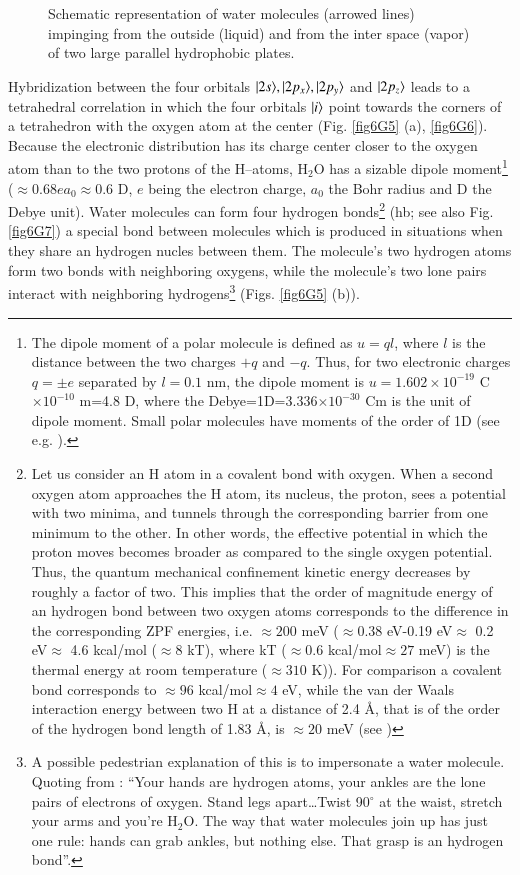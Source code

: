 \begin{subappendices}
\begin{figure}
\caption{Schematic representation of water molecules (arrowed lines) impinging from the outside (liquid) and from the inter space (vapor) of two large parallel hydrophobic plates.}\label{fig6G8}
\end{figure}
Hybridization between the four orbitals $|{2s} \rangle,|{2p_x} \rangle,|{2p_y} \rangle$ and $|{2p_z} \rangle$ leads to a tetrahedral correlation in which the four orbitals $|{i} \rangle$ point towards the corners of a tetrahedron with the oxygen atom at the center (Fig. \ref{fig6G5} (a), \ref{fig6G6}). Because the electronic distribution has its charge center closer to the oxygen atom than to the two protons of the H--atoms, H$_2$O has a sizable dipole moment\footnote{The dipole moment of a polar molecule is defined as $u=ql$, where $l$ is the distance between the two charges $+q$ and $-q$. Thus, for two electronic charges $q=\pm e$ separated by $l=0.1$ nm, the dipole moment is $u=1.602\times 10^{-19}$ C$\times10^{-10}$ m=4.8 D, where the Debye=1D=3.336$\times10^{-30}$ Cm is the unit of dipole moment. Small polar molecules have moments of the order of 1D (see e.g. \cite{Israelachvili:85}).} ($\approx 0.68 ea_0\approx0.6$ D, $e$ being the electron charge, $a_0$ the Bohr radius and D the Debye unit). Water molecules can form four hydrogen bonds\footnote{Let us consider an H atom in a covalent bond with oxygen. When a second oxygen atom approaches the H atom, its nucleus, the proton, sees a potential with two minima, and tunnels through the corresponding barrier from one minimum to the other. In other words, the effective potential in which the proton moves becomes broader as compared to the single oxygen potential. Thus, the quantum mechanical confinement kinetic energy decreases by roughly a factor of two. This implies that the order of magnitude energy of an hydrogen bond between two oxygen atoms corresponds to the difference in the corresponding ZPF energies, i.e. $\approx200$ meV ($\approx 0.38$ eV-0.19 eV$\approx$ 0.2 eV$\approx$ 4.6 kcal/mol ($\approx8$ kT), where kT ($\approx0.6$ kcal/mol$\approx27$ meV) is the thermal energy at room temperature ($\approx310$ K)). For comparison a covalent  bond corresponds to $\approx96$ kcal/mol$\approx4$ eV, while the van der Waals interaction energy between two H at a distance of 2.4 \AA, that is of the order of the hydrogen bond length of 1.83 \AA,  is $\approx20$ meV (see \cite{Povh:02})} (hb; see also Fig. \ref{fig6G7}) a special bond between molecules which is produced in situations when they share an hydrogen nucles between them. The molecule's two hydrogen atoms form two bonds with neighboring oxygens, while the molecule's two lone pairs interact with neighboring hydrogens\footnote{A possible pedestrian explanation of this is to impersonate a water molecule. Quoting from \cite{Ball:03}: ``Your hands are hydrogen atoms, your ankles are the lone pairs of electrons of oxygen. Stand legs apart\dots Twist 90$^\circ$ at the waist, stretch your arms and you're H$_2$O. The way that water molecules join up has just one rule: hands can grab ankles, but nothing else. That grasp is an hydrogen bond''.} (Figs. \ref{fig6G5} (b)). 



\end{subappendices}
